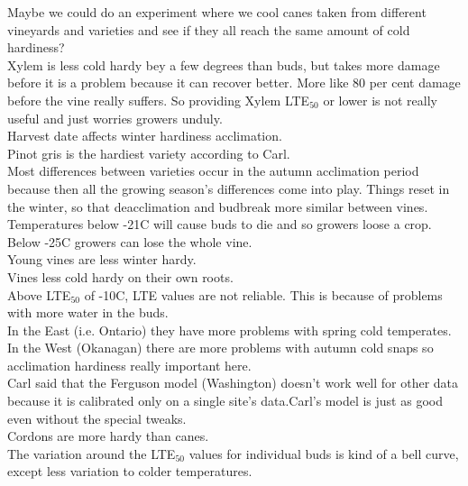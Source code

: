 \documentclass[11pt,letter]{article}
\begin{document}
Maybe we could do an experiment where we cool canes taken from different vineyards and varieties and see if they all reach the same amount of cold hardiness? \\

Xylem is less cold hardy bey a few degrees than buds, but takes more damage before it is a problem because it can recover better. More like 80 per cent damage before the vine really suffers. So providing Xylem LTE$_{50}$ or lower is not really useful and just worries growers unduly. \\

Harvest date affects winter hardiness acclimation. \\

Pinot gris is the hardiest variety according to Carl. \\

Most differences between varieties occur in the autumn acclimation period because then all the growing season's differences come into play. Things reset in the winter, so that deacclimation and budbreak more similar between vines. \\

Temperatures below -21\textdegree C will cause buds to die and so growers loose a crop. Below -25\textdegree C growers can lose the whole vine. \\

Young vines are less winter hardy. \\

Vines less cold hardy on their own roots. \\

Above LTE$_{50}$ of -10\textdegree C, LTE values are not reliable. This is because of problems with more water in the buds. \\

In the East (i.e. Ontario) they have more problems with spring cold temperates. In the West (Okanagan) there are more problems with autumn cold snaps so acclimation hardiness really important here. \\

Carl said that the Ferguson model (Washington) doesn't work well for other data because it is calibrated only on a single site's data.Carl's model is just as good even without the special tweaks.\\

Cordons are more hardy than canes. \\

The variation around the LTE$_{50}$ values for individual buds is kind of a bell curve, except less variation to colder temperatures. \\
\end{document}

